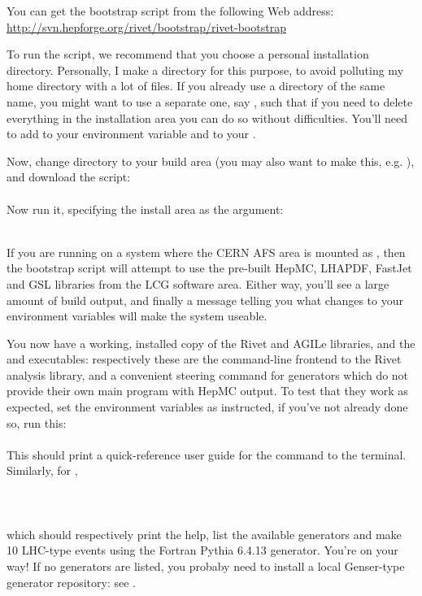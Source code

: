 \documentclass{JHEP3}
\begin{document}
You can get the bootstrap script from the following Web address:
\url{http://svn.hepforge.org/rivet/bootstrap/rivet-bootstrap}

To run the script, we recommend that you choose a personal installation
directory. Personally, I make a  directory for this purpose, to
avoid polluting my home directory with a lot of files. If you already use a
directory of the same name, you might want to use a separate one, say
, such that if you need to delete everything in the
installation area you can do so without difficulties. You'll need to add
 to your  environment variable and
 to your .

Now, change directory to your build area (you may also want to make this,
e.g. ), and download the script:\\
\\
Now run it, specifying the install area as the argument:\\
\\

If you are running on a system where the CERN AFS area is mounted as
, then the bootstrap script will attempt to use the pre-built
HepMC, LHAPDF, FastJet and GSL libraries from the LCG software area. Either way,
you'll see a large amount of build output, and finally a message telling you
what changes to your environment variables will make the system useable. 

You now have a working, installed copy of the Rivet and AGILe libraries, and the
 and  executables: respectively these are the
command-line frontend to the Rivet analysis library, and a convenient steering
command for generators which do not provide their own main program with HepMC
output. To test that they work as expected, set the environment variables as
instructed, if you've not already done so, run this:\\
\\
%
This should print a quick-reference user guide for the  command to
the terminal. Similarly, for ,\\
\\
\\
\\
which should respectively print the help, list the available generators and make
10 LHC-type events using the Fortran Pythia 6.4.13 generator. You're on your
way! If no generators are listed, you probaby need to install a local
Genser-type generator repository: see .
\end{document}
